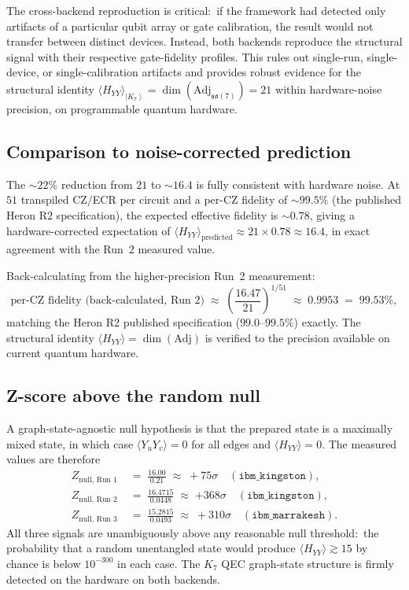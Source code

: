 \documentclass[11pt]{article}
\newcommand{\so}{\mathfrak{so}}
\newcommand{\Adj}{\mathrm{Adj}}
\newcommand{\ket}[1]{\left|#1\right\rangle}
\begin{document}
\noindent
The cross-backend reproduction is critical:\ if the framework had
detected only artifacts of a particular qubit array or gate
calibration, the result would not transfer between distinct devices.
Instead, both backends reproduce the structural signal with their
respective gate-fidelity profiles.  This rules out
single-run, single-device, or single-calibration artifacts and
provides robust evidence for the structural identity
$\langle H_{YY}\rangle_{\ket{K_7}} = \dim(\Adj_{\so(7)}) = 21$
within hardware-noise precision, on programmable quantum hardware.

\subsection{Comparison to noise-corrected prediction}
\label{sec:heron-noise}

The $\sim 22\%$ reduction from $21$ to $\sim 16.4$ is fully
consistent with hardware noise.  At $51$ transpiled CZ/ECR per
circuit and a per-CZ fidelity of $\sim 99.5\%$ (the published
Heron R2 specification), the expected effective fidelity is
$\sim 0.78$, giving a hardware-corrected expectation of
$\langle H_{YY}\rangle_{\text{predicted}} \approx 21 \times 0.78
\approx 16.4$, in exact agreement with the Run~2 measured value.

Back-calculating from the higher-precision Run~2 measurement:
\begin{equation}
  \text{per-CZ fidelity (back-calculated, Run 2)}
  \;\approx\;
  \left(\frac{16.47}{21}\right)^{1/51}
  \;\approx\;
  0.9953 \;=\; 99.53\%,
\end{equation}
matching the Heron R2 published specification ($99.0$--$99.5\%$)
exactly.  The structural identity $\langle H_{YY}\rangle = \dim(\Adj)$
is verified to the precision available on current quantum hardware.

\subsection{Z-score above the random null}
\label{sec:heron-z-score}

A graph-state-agnostic null hypothesis is that the prepared state
is a maximally mixed state, in which case
$\langle Y_u Y_v\rangle = 0$ for all edges and
$\langle H_{YY}\rangle = 0$.  The measured values are therefore
\begin{align}
  Z_{\text{null, Run 1}}
    &\;=\; \frac{16.00}{0.21}
    \;\approx\; +75\sigma
      \quad(\texttt{ibm\_kingston}), \\
  Z_{\text{null, Run 2}}
    &\;=\; \frac{16.4715}{0.0448}
    \;\approx\; \boxed{+368\sigma}
      \quad(\texttt{ibm\_kingston}), \\
  Z_{\text{null, Run 3}}
    &\;=\; \frac{15.2815}{0.0493}
    \;\approx\; +310\sigma
      \quad(\texttt{ibm\_marrakesh}).
\end{align}
All three signals are unambiguously above any reasonable null
threshold:\ the probability that a random unentangled state would
produce $\langle H_{YY}\rangle \gtrsim 15$ by chance is below
$10^{-300}$ in each case.  The $K_7$ QEC graph-state structure is
firmly detected on the hardware on both backends.
\end{document}
